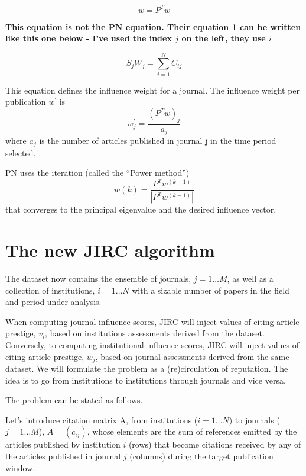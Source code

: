 \documentclass[10pt]{article}
\begin{document}
\begin{equation}
w = P^Tw
\end{equation}

\textbf{This equation is not the PN equation. Their equation 1 can be written like this one below - I've used the index $j$ on the left, they use $i$}

\begin{equation}
S_j W_j = \sum_{i=1}^{N}C_{ij}
\end{equation}



This equation defines the influence weight for a journal. The influence weight per
publication $w^{\prime}$ is
\begin{equation}
w^{\prime}_j =
\frac{(P^Tw)_j}{a_{j}}
\end{equation}
where $a_j$ is the number of articles published in journal j in the time period
selected.

\noindent PN uses the iteration (called the “Power method”)
\begin{equation}
w(k)=\frac{P^Tw^{(k-1)}}{|P^Tw^{(k-1)}|}
\end{equation}
that converges to the principal eigenvalue and the desired influence vector.

\section{ The new JIRC algorithm}
 The dataset now contains the ensemble of journals,
 $j=1\ldots M$, as well as a collection of institutions, $i=1\ldots N$ with a sizable number of papers  in the field and period under analysis.

When computing journal influence scores, JIRC will inject  values of citing article prestige, $v_i$, based on institutions assessments derived from the  dataset. Conversely, to
 computing institutional influence scores, JIRC will inject  values of citing article prestige, $w_j$, based on journal assessments derived from the same dataset.
We will formulate the problem as a (re)circulation of reputation. The idea is to go from institutions to institutions through journals and vice versa.

\noindent The problem can be stated as follows.

Let's introduce  citation matrix A, from institutions ($i=1\ldots N$) to journals ($j=1\ldots M$), $A = (c_{ij})$,  whose elements are the sum of references emitted by
the articles published by institution $i$ (rows) that become citations received by any of the articles published in journal $j$ (columns) during the target
publication window.
\end{document}
